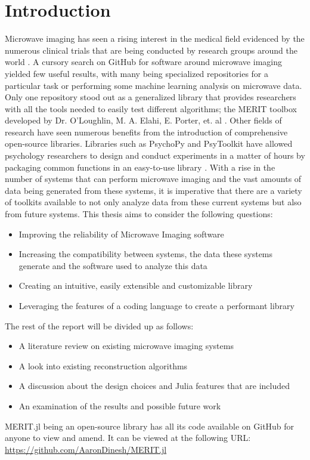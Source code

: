\chapter*{Introduction}
Microwave imaging has seen a rising interest in the medical field evidenced by the numerous clinical trials that are
being conducted by research groups around the world \cite{preeceMARIAM4Clinical2016, moloneyWaveliaMicrowaveBreast2021,
e.c.fearMicrowaveBreastImaging2013}. A cursory search on GitHub for software around microwave imaging yielded few useful
results, with many being specialized repositories for a particular task or performing some machine learning analysis on
microwave data. Only one repository stood out as a generalized library that provides researchers with all the tools
needed to easily test different algorithms; the MERIT toolbox developed by Dr. O'Loughlin, M. A. Elahi, E. Porter, et.
al \cite{d.oloughlinOpensourceSoftwareMicrowave2018}. Other fields of research have seen numerous benefits from the
introduction of comprehensive open-source libraries. Libraries such as PsychoPy and PsyToolkit have allowed psychology
researchers to design and conduct experiments in a matter of hours by packaging common functions in an easy-to-use
library \cite{stoetPsyToolkitTestimonials}. With a rise in the number of systems that can perform microwave imaging
and the vast amounts of data being generated from these systems, it is imperative that there are a variety of toolkits
available to not only analyze data from these current systems but also from future systems. This thesis aims to
consider the following questions:
\begin{itemize}
    \item Improving the reliability of Microwave Imaging software
    \item Increasing the compatibility between systems, the data these systems generate and the software used to analyze
    this data
    \item Creating an intuitive, easily extensible and customizable library
    \item Leveraging the features of a coding language to create a performant library   
\end{itemize}
\hfill \break

The rest of the report will be divided up as follows:
\begin{itemize}
    \item A literature review on existing microwave imaging systems
    \item A look into existing reconstruction algorithms 
    \item A discussion about the design choices and Julia features that are included
    \item An examination of the results and possible future work
\end{itemize}

MERIT.jl being an open-source library has all its code available on GitHub for anyone to view and amend. It can be
viewed at the following URL: \url{https://github.com/AaronDinesh/MERIT.jl}
